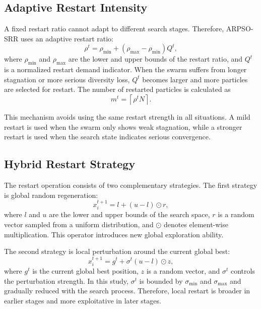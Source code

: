 \documentclass[conference]{IEEEtran}
\begin{document}
\subsection{Adaptive Restart Intensity}
A fixed restart ratio cannot adapt to different search stages. Therefore, ARPSO-SRR uses an adaptive restart ratio:
\begin{equation}
    \rho^t=\rho_{\min}+(\rho_{\max}-\rho_{\min})Q^t,
    \label{eq:restart_ratio}
\end{equation}
where $\rho_{\min}$ and $\rho_{\max}$ are the lower and upper bounds of the restart ratio, and $Q^t$ is a normalized restart demand indicator. When the swarm suffers from longer stagnation or more serious diversity loss, $Q^t$ becomes larger and more particles are selected for restart. The number of restarted particles is calculated as
\begin{equation}
    m^t=\left\lceil \rho^t N \right\rceil .
    \label{eq:restart_number}
\end{equation}

This mechanism avoids using the same restart strength in all situations. A mild restart is used when the swarm only shows weak stagnation, while a stronger restart is used when the search state indicates serious convergence.

\subsection{Hybrid Restart Strategy}
The restart operation consists of two complementary strategies. The first strategy is global random regeneration:
\begin{equation}
    x_i^{t+1}=l+(u-l)\odot r,
    \label{eq:global_restart}
\end{equation}
where $l$ and $u$ are the lower and upper bounds of the search space, $r$ is a random vector sampled from a uniform distribution, and $\odot$ denotes element-wise multiplication. This operator introduces new global exploration ability.

The second strategy is local perturbation around the current global best:
\begin{equation}
    x_i^{t+1}=g^t+\sigma^t (u-l)\odot z,
    \label{eq:local_restart}
\end{equation}
where $g^t$ is the current global best position, $z$ is a random vector, and $\sigma^t$ controls the perturbation strength. In this study, $\sigma^t$ is bounded by $\sigma_{\min}$ and $\sigma_{\max}$ and gradually reduced with the search process. Therefore, local restart is broader in earlier stages and more exploitative in later stages.
\end{document}
